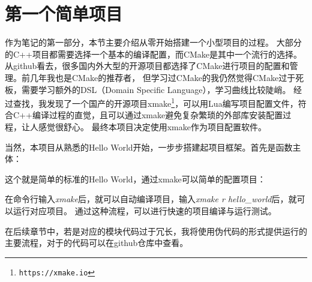 \section{第一个简单项目}
作为笔记的第一部分，本节主要介绍从零开始搭建一个小型项目的过程。
大部分的C++项目都需要选择一个基本的编译配置，而CMake是其中一个流行的选择。
从github看去，很多国内外大型的开源项目都选择了CMake进行项目的配置和管理。前几年我也是CMake的推荐者，
但学习过CMake的我仍然觉得CMake过于死板，需要学习额外的DSL（Domain Specific Language），学习曲线比较陡峭。
经过查找，我发现了一个国产的开源项目xmake\footnote{\nolinkurl{https://xmake.io}}，可以用Lua编写项目配置文件，符合C++编译过程的直觉，且可以通过xmake避免复杂繁琐的外部库安装配置过程，让人感觉很舒心。
最终本项目决定使用xmake作为项目配置软件。

当然，本项目从熟悉的Hello World开始，一步步搭建起项目框架。首先是函数主体：



这个就是简单的标准的Hello World，通过xmake可以简单的配置项目：



在命令行输入{\itshape xmake}后，就可以自动编译项目，输入{\itshape xmake r hello\_world}后，就可以运行对应项目。
通过这种流程，可以进行快速的项目编译与运行测试。

在后续章节中，若是对应的模块代码过于冗长，我将使用伪代码的形式提供运行的主要流程，对于的代码可以在github仓库中查看。
